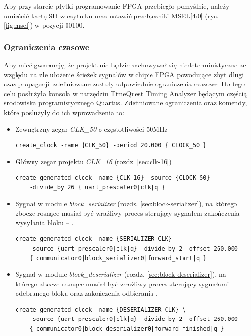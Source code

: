 Aby przy starcie płytki programowanie FPGA przebiegło pomyślnie, należy umieścić kartę SD w czytniku oraz ustawić przełączniki MSEL[4:0] (rys. \ref{fig:msel}) w pozycji 00100.

\subsubsection{Ograniczenia czasowe}
Aby mieć gwarancję, że projekt nie będzie zachowywał się niedeterministyczne ze względu na złe ułożenie ścieżek sygnałów w chipie FPGA powodujące zbyt długi czas propagacji, zdefiniowane zostały odpowiednie ograniczenia czasowe. Do tego celu posłużyła konsola w narzędziu TimeQuest Timing Analyzer będącym częścią środowiska programistycznego Quartus. Zdefiniowane ograniczenia oraz komendy, które posłużyły do ich wprowadzenia to:

\begin{itemize}
\item Zewnętrzny zegar \textit{CLK\_50} o częstotliwości 50MHz
\begin{lstlisting}[basicstyle=\footnotesize]
create_clock -name {CLK_50} -period 20.000 { CLOCK_50 }
\end{lstlisting}

\item Główny zegar projektu \textit{CLK\_16} (rozdz. \ref{sec:clk-16})
\begin{lstlisting}[basicstyle=\footnotesize]
create_generated_clock -name {CLK_16} -source {CLOCK_50} 
	-divide_by 26 { uart_prescaler0|clk|q }
\end{lstlisting}

\item Sygnał w module \textit{block\_serializer} (rozdz. \ref{sec:block-serializer}), na którego zbocze rosnące musiał być wrażliwy proces sterujący sygnałem zakończenia wysyłania bloku -- .
\begin{lstlisting}[basicstyle=\footnotesize]
create_generated_clock -name {SERIALIZER_CLK} 
	-source {uart_prescaler0|clk|q} -divide_by 2 -offset 260.000 
	{ communicator0|block_serializer0|forward_start|q }
\end{lstlisting}

\item Sygnał w module \textit{block\_deserializer} (rozdz. \ref{sec:block-deserializer}), na którego zbocze rosnące musiał być wrażliwy proces sterujący sygnałami odebranego bloku  oraz zakończenia odbierania .
\begin{lstlisting}[basicstyle=\footnotesize]
create_generated_clock -name {DESERIALIZER_CLK} \
	-source {uart_prescaler0|clk|q} -divide_by 2 -offset 260.000 
	{ communicator0|block_deserializer0|forward_finished|q }
\end{lstlisting}

\end{itemize}

